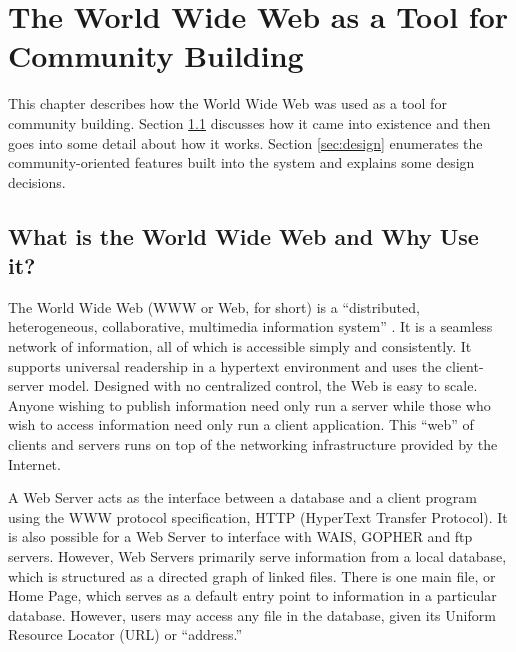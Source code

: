 
\chapter{The World Wide Web as a Tool for Community Building}
\label{chap:www}
This chapter describes how the World Wide Web was used as a tool for community
building.  Section \ref{sec:background} discusses how it came into existence
and then goes into some detail about how it works.  Section \ref{sec:design}
enumerates the community-oriented features built into the system and explains
some design decisions.


\section{What is the World Wide Web and Why Use it?}
\label{sec:background}
The World Wide Web (WWW or Web, for short) is a ``distributed, heterogeneous,
collaborative, multimedia information system'' \cite{Berners-Lee94}.  It is a
seamless network of information, all of which is accessible simply and
consistently.  It supports universal readership in a hypertext environment and
uses the client-server model.  Designed with no centralized control, the Web is
easy to scale.  Anyone wishing to publish information need only run a server
while those who wish to access information need only run a client application.
This ``web'' of clients and servers runs on top of the networking
infrastructure provided by the Internet.

A Web Server acts as the interface between a database and a client program
using the WWW protocol specification, HTTP (HyperText Transfer Protocol).  It
is also possible for a Web Server to interface with WAIS, GOPHER and ftp
servers.  However, Web Servers primarily serve information from a local
database, which is structured as a directed graph of linked files.  There is
one main file, or Home Page, which serves as a default entry point to
information in a particular database.  However, users may access any file in
the database, given its Uniform Resource Locator (URL) or ``address.''

